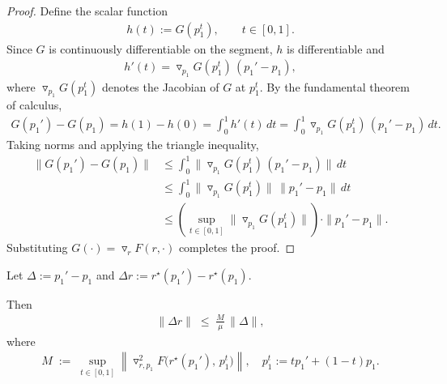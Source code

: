 \begin{proof}
Define the scalar function
\begin{align*}
h(t) := G(p_1^t),\qquad t\in[0,1].
\end{align*}
Since $G$ is continuously differentiable on the segment, $h$ is differentiable and
\begin{align*}
h'(t) = \triangledown_{p_1}G(p_1^t)\,(p_1'-p_1),
\end{align*}
where $\triangledown_{p_1}G(p_1^t)$ denotes the Jacobian of $G$ at $p_1^t$.
By the fundamental theorem of calculus,
\begin{align*}
G(p_1')-G(p_1) = h(1)-h(0) = \int_0^1 h'(t)\,dt
= \int_0^1 \triangledown_{p_1}G(p_1^t)\,(p_1'-p_1)\,dt.
\end{align*}
Taking norms and applying the triangle inequality,
\begin{align*}
\|G(p_1')-G(p_1)\|
&\le \int_0^1 \|\triangledown_{p_1}G(p_1^t)\,(p_1'-p_1)\|\,dt \\
&\le \int_0^1 \|\triangledown_{p_1}G(p_1^t)\|\,\|p_1'-p_1\|\,dt \\
&\le \left(\sup_{t\in[0,1]}\|\triangledown_{p_1}G(p_1^t)\|\right)\cdot \|p_1'-p_1\|.
\end{align*}
Substituting $G(\cdot)=\triangledown_r F(r,\cdot)$ completes the proof.
\end{proof}


\begin{lemma}\label{lem:stability}
Let $\Delta := p_1'-p_1$ and $\Delta r := r^\star(p_1')-r^\star(p_1)$. 

Then
\begin{align*}
\|\Delta r\| \;\le\; \frac{M}{\mu}\,\|\Delta\|,
\end{align*}
where
\begin{align*}
M \;:=\; \sup_{t\in[0,1]} \left\| \triangledown^2_{r,p_1} F\big(r^\star(p_1'),\, p_1^t\big)\right\|,\quad
p_1^t := t p_1' + (1-t)p_1.
\end{align*}
\end{lemma}

